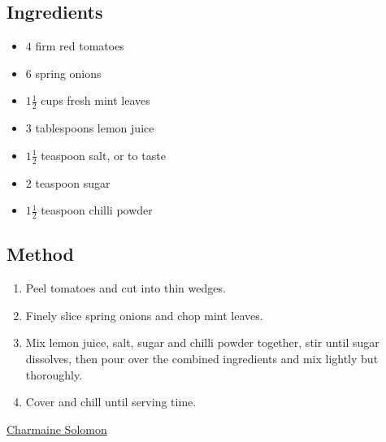 \documentclass[11pt,a4paper]{article}
\begin{document}
\subsection*{Ingredients}

\begin{itemize}
  \item $ 4 $ firm red tomatoes
  \item $ 6 $ spring onions
  \item $ 1 \frac{1}{2} $ cups fresh mint leaves
  \item $ 3 $ tablespoons lemon juice
  \item $ 1 \frac{1}{2} $ teaspoon salt, or to taste
  \item $ 2 $ teaspoon sugar
  \item $ 1 \frac{1}{2} $ teaspoon chilli powder
\end{itemize}

\medskip

\subsection*{Method}

\begin{enumerate}
  \item Peel tomatoes and cut into thin wedges.
  \item Finely slice spring onions and chop mint leaves.
  \item Mix lemon juice, salt, sugar and chilli powder together, stir until
        sugar dissolves, then pour over the combined ingredients and
        mix lightly but thoroughly.
  \item Cover and chill until serving time. 
\end{enumerate}

\href{https://www.charmainesolomon.com/}{Charmaine Solomon}
\end{document}
